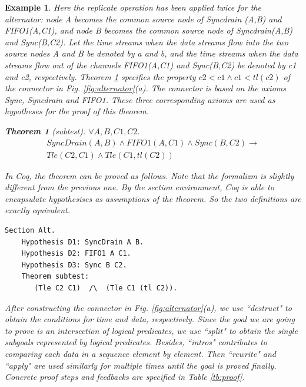 \documentclass[3p,times]{elsarticle}
\newtheorem{example}{Example}[section]
\newtheorem{theorem}{Theorem}[section]
\begin{document}
\begin{example}
Here the replicate operation has been applied twice for the alternator: node \emph{A} becomes the common source node of \emph{Syncdrain (A,B)} and \emph{FIFO1(A,C1)}, and node \emph{B} becomes the common source node of \emph{Syncdrain(A,B)} and \emph{Sync(B,C2)}. Let the time streams when the
data streams flow into the two source nodes \emph{A} and \emph{B} be denoted by \emph{a} and \emph{b}, and the time streams when the data streams
flow out of the channels \emph{FIFO1(A,C1)} and \emph{Sync(B,C2)} be denoted by \emph{c1} and \emph{c2}, respectively. Theorem \ref{the:alternator}
specifies the property $c2<c1 \wedge c1<tl (c2)$ of the connector in Fig. \ref{fig:alternator}(a). The connector is based on the axioms
Sync, Syncdrain and FIFO1. These three corresponding axioms are used as hypotheses for the proof of this theorem.
\begin{theorem}[subtest]\label{the:alternator}
$\forall A,B,C1,C2.$
\begin{eqnarray*}
  & SyncDrain(A,B)\land FIFO1(A,C1)\land Sync(B,C2)  \rightarrow & \\
  & Tle(C2,C1) \wedge Tle(C1, tl(C2))
\end{eqnarray*}
\end{theorem}
In Coq, the theorem can be proved as follows. Note that the formalizm is slightly different from the previous one. By the \emph{section} environment, Coq is able to encapsulate hypothesises as assumptions of the theorem. So the two definitions are exactly equivalent.

\begin{lstlisting}[language=coq]
    Section Alt.
    Hypothesis D1: SyncDrain A B.
    Hypothesis D2: FIFO1 A C1.
    Hypothesis D3: Sync B C2.
    Theorem subtest:
       (Tle C2 C1)  /\  (Tle C1 (tl C2)).
\end{lstlisting}

After constructing the connector in Fig. \ref{fig:alternator}(a), we use ``destruct" to obtain the conditions for time and data, respectively.
Since the goal we are going to prove is an intersection of logical predicates, we use ``split" to obtain the single subgoals represented by
logical predicates. Besides, ``intros" contributes to comparing each data in a sequence element by element. Then ``rewrite" and ``apply" are
used similarly for multiple times until the goal is proved finally. %
Concrete proof steps and feedbacks are specified in Table \ref{tb:proof}.


\end{example}
\end{document}
